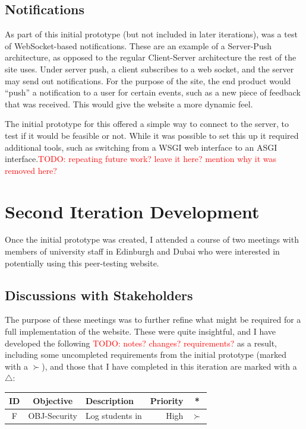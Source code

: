 \documentclass[a4paper,11pt]{report}
\newcommand{\todo}[1]{\textcolor{red}{TODO: #1}}
\newcounter{FunCount}
\newcommand{\freq}[4]{\addtocounter{FunCount}{1}F\arabic{FunCount} & OBJ-#1 & #2 & #3 & #4\\}
\begin{document}
\section{Notifications}
As part of this initial prototype (but not included in later iterations), was a test of WebSocket-based notifications. These are an example of a Server-Push architecture, as opposed to the regular Client-Server architecture the rest of the site uses. Under server push, a client subscribes to a web socket, and the server may send out notifications. For the purpose of the site, the end product would ``push'' a notification to a user for certain events, such as a new piece of feedback that was received. This would give the website a more dynamic feel.\par
The initial prototype for this offered a simple way to connect to the server, to test if it would be feasible or not. While it was possible to set this up it required additional tools, such as switching from a WSGI web interface to an ASGI interface.\todo{repeating future work? leave it here? mention why it was removed here?}

\chapter{Second Iteration Development}
Once the initial prototype was created, I attended a course of two meetings with members of university staff in Edinburgh and Dubai who were interested in potentially using this peer-testing website.\par
\section{Discussions with Stakeholders}
The purpose of these meetings was to further refine what might be required for a full implementation of the website. These were quite insightful, and I have developed the following \todo{notes? changes? requirements?} as a result, including some uncompleted requirements from the initial prototype (marked with a $\succ$), and those that I have completed in this iteration are marked with a $\bigtriangleup$:
\begin{longtable}{cclrc}
\textbf{ID} & \textbf{Objective} & \textbf{Description} & \textbf{Priority} & \textbf{*}\\\hline
\freq{Security}{Log students in}{High}{$\succ$}
\end{longtable}
\end{document}
